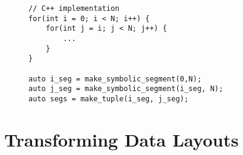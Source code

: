 \begin{figure}
	\begin{lstlisting}[caption={An example of a loop with a triangular iteration space, expressed in C++ and using our SymbolicSegments.},label={TriangularIterationSpace}]
// C++ implementation
for(int i = 0; i < N; i++) {
	for(int j = i; j < N; j++) {
		...
	}
}

auto i_seg = make_symbolic_segment(0,N);
auto j_seg = make_symbolic_segment(i_seg, N);
auto segs = make_tuple(i_seg, j_seg);

	\end{lstlisting}

\end{figure}

\section{Transforming Data Layouts}









